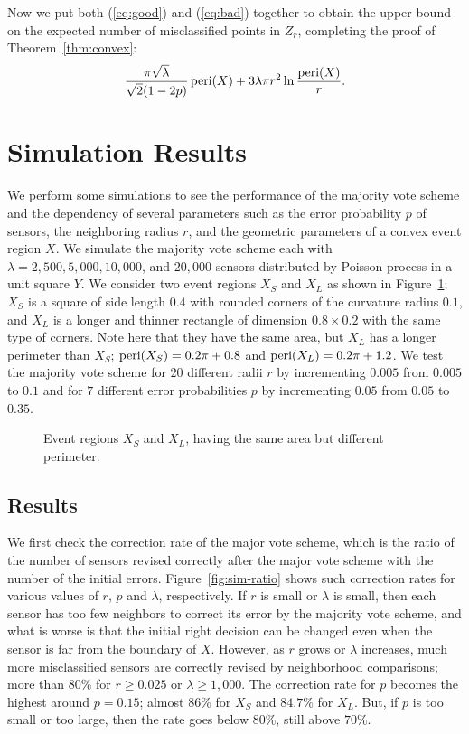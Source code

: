 \documentclass{article}
\def\peri{\mathop{\rm peri}}
\begin{document}
\par
Now we put both  (\ref{eq:good}) and (\ref{eq:bad}) together to obtain the upper bound on the expected number of misclassified points in $Z_r$, completing the proof of Theorem~\ref{thm:convex}:
\[{\pi\sqrt{\lambda}\over \sqrt{2}(1-2p)} \peri(X)+ 3 \lambda\pi r^2 \ln {\peri(X)\over r}.\]


\section{Simulation Results}\label{sec:experiment}

We perform some simulations to see the performance of the majority vote scheme and the dependency of several parameters such as the error probability $p$ of sensors, the neighboring radius $r$, and the geometric parameters of a convex event region $X$. We simulate the majority vote scheme each with $\lambda=2,500, 5,000, 10,000$, and $20,000$ sensors distributed by Poisson process in a unit square $Y$. We consider two event regions $X_S$ and $X_L$ as shown in Figure~\ref{fig:experiment}; $X_S$ is a square of side length $0.4$ with rounded corners of the curvature radius $0.1$, and $X_L$ is a longer and thinner rectangle of dimension $0.8\times 0.2$ with the same type of corners. Note here that they have the same area, but $X_L$ has a longer perimeter than $X_S$; $\peri(X_S)=0.2\pi+0.8$ and $\peri(X_L)=0.2\pi+1.2$. We test the majority vote scheme for $20$ different radii $r$ by incrementing $0.005$ from $0.005$ to $0.1$ and for $7$ different error probabilities $p$ by incrementing $0.05$ from $0.05$ to $0.35$.

\begin{figure}
\centering
{}\quad\quad\quad\quad
{}
\caption{Event regions $X_S$ and $X_L$, having the same area but different perimeter.}
\label{fig:experiment}
\end{figure}

\subsection{Results}

We first check the correction rate of the major vote scheme, which is the ratio of the number of sensors revised correctly after the major vote scheme with the number of the initial errors. Figure~\ref{fig:sim-ratio} shows such correction rates for various values of $r$, $p$ and $\lambda$, respectively. If $r$ is small or $\lambda$ is small, then each sensor has too few neighbors to correct its error by the majority vote scheme, and what is worse is that the initial right decision can be changed even when the sensor is far from the boundary of $X$. However, as $r$ grows or $\lambda$ increases, much more misclassified sensors are correctly revised by neighborhood comparisons; more than $80\%$ for $r \geq 0.025$ or $\lambda \geq 1,000$. The correction rate for $p$ becomes the highest around $p = 0.15$; almost $86\%$ for $X_S$ and $84.7\%$ for $X_L$. But, if $p$ is too small or too large, then the rate goes below $80\%$, still above $70\%$.
\end{document}
